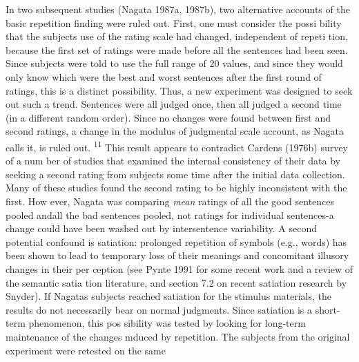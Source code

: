 \begin{styleStandard}
In two subsequent studies (Nagata 1987a, 1987b), two alternative accounts of the basic repetition finding were ruled out. First, one must consider the possi\- bility that the subjects{\textquotesingle} use of the rating scale had changed, independent of repeti\- tion, because the first set of ratings were made before all the sentences had been seen. Since subjects were told to use the full range of 20 values, and since they would only know which were the best and worst sentences after the first round of ratings, this is a distinct possibility. Thus, a new experiment was designed to seek out such a trend. Sentences were all judged once, then all judged a second time (in a different random order). Since no changes were found between first and second ratings, a {\textquotedbl}change in the modulus of judgmental scale{\textquotedbl} account, as Nagata calls it, is ruled out. \textsuperscript{11}\textsuperscript{ }This result appears to contradict Carden{\textquotesingle}s (1976b) survey of a num\- ber of studies that examined the internal consistency of their data by seeking a second rating from subjects some time after the initial data collection. Many of these studies found the second rating to be highly inconsistent with the first. How\- ever, Nagata was comparing \textit{mean}\textit{ }ratings of all the good sentences pooled and{\textquotesingle}all the bad sentences pooled, not ratings for individual sentences{}-a change could have been washed out by intersentence variability. A second potential confound is satiation: prolonged repetition of symbols (e.g., words) has been shown to lead to temporary loss of their meanings and concomitant illusory changes in their per\- ception (see Pynte 1991 for some recent work and a review of the semantic satia\- tion literature, and section 7.2 on recent satiation research by Snyder). If Nagata{\textquotesingle}s subjects reached satiation for the stimulus materials, the results do not necessarily bear on normal judgments. Since satiation is a short-term phenomenon, this pos\- sibility was tested by looking for long-term maintenance of the changes mduced by repetition. The subjects from the original experiment were retested on the same
\end{styleStandard}


